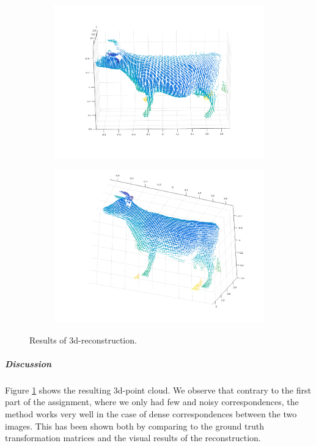 \documentclass{paper}
\begin{document}
\begin{figure}[h!]
    \centering
    \begin{subfigure}[]{0.75\textwidth}
        \centering
        \includegraphics[width=\textwidth]{cow3d1}
    \end{subfigure}
    \begin{subfigure}[]{0.8\textwidth}
        \centering
        \includegraphics[width=\textwidth]{cow3d2}
    \end{subfigure}
    \caption{Results of 3d-reconstruction.}
\label{fig:cow3d}
\end{figure}
\subparagraph{Discussion} Figure \ref{fig:cow3d} shows the resulting 3d-point cloud. We observe that contrary to the first part of the assignment, where we only had few and noisy correspondences, the method works very well in the case of dense correspondences between the two images. This has been shown both by comparing to the ground truth transformation matrices and the visual results of the reconstruction.
\end{document}
